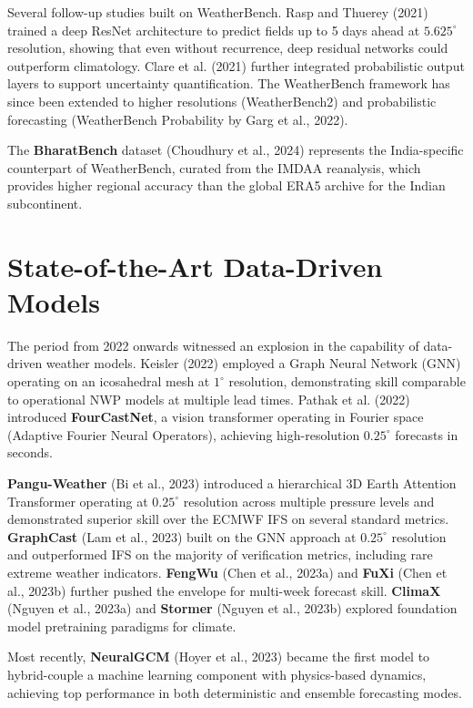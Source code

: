 \documentclass[12pt,a4paper,oneside]{report}
\begin{document}
Several follow-up studies built on WeatherBench. Rasp and Thuerey (2021) trained a deep ResNet architecture to predict fields up to 5 days ahead at $5.625^\circ$ resolution, showing that even without recurrence, deep residual networks could outperform climatology. Clare et al. (2021) further integrated probabilistic output layers to support uncertainty quantification. The WeatherBench framework has since been extended to higher resolutions (WeatherBench2) and probabilistic forecasting (WeatherBench Probability by Garg et al., 2022).

The \textbf{BharatBench} dataset (Choudhury et al., 2024) represents the India-specific counterpart of WeatherBench, curated from the IMDAA reanalysis, which provides higher regional accuracy than the global ERA5 archive for the Indian subcontinent.

\section{State-of-the-Art Data-Driven Models}

The period from 2022 onwards witnessed an explosion in the capability of data-driven weather models. Keisler (2022) employed a Graph Neural Network (GNN) operating on an icosahedral mesh at $1^\circ$ resolution, demonstrating skill comparable to operational NWP models at multiple lead times. Pathak et al. (2022) introduced \textbf{FourCastNet}, a vision transformer operating in Fourier space (Adaptive Fourier Neural Operators), achieving high-resolution $0.25^\circ$ forecasts in seconds.

\textbf{Pangu-Weather} (Bi et al., 2023) introduced a hierarchical 3D Earth Attention Transformer operating at $0.25^\circ$ resolution across multiple pressure levels and demonstrated superior skill over the ECMWF IFS on several standard metrics. \textbf{GraphCast} (Lam et al., 2023) built on the GNN approach at $0.25^\circ$ resolution and outperformed IFS on the majority of verification metrics, including rare extreme weather indicators. \textbf{FengWu} (Chen et al., 2023a) and \textbf{FuXi} (Chen et al., 2023b) further pushed the envelope for multi-week forecast skill. \textbf{ClimaX} (Nguyen et al., 2023a) and \textbf{Stormer} (Nguyen et al., 2023b) explored foundation model pretraining paradigms for climate.

Most recently, \textbf{NeuralGCM} (Hoyer et al., 2023) became the first model to hybrid-couple a machine learning component with physics-based dynamics, achieving top performance in both deterministic and ensemble forecasting modes.
\end{document}
